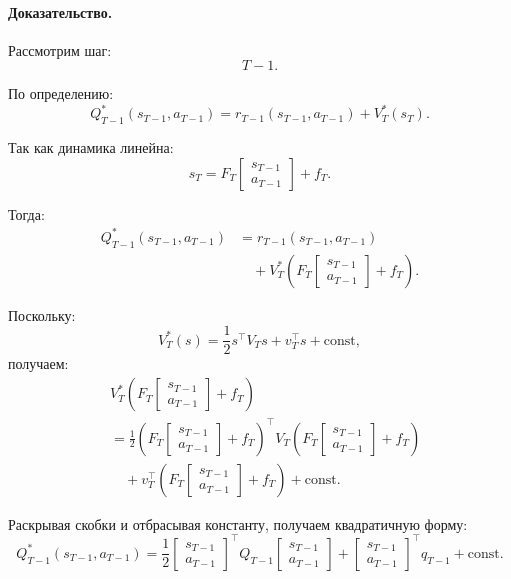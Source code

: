 \documentclass[12pt,a4paper]{article}
\begin{document}
\paragraph{Доказательство.}

Рассмотрим шаг:
\[
T-1.
\]

По определению:
\[
Q_{T-1}^\ast(s_{T-1},a_{T-1})
=
r_{T-1}(s_{T-1},a_{T-1})
+
V_T^\ast(s_T).
\]

Так как динамика линейна:
\[
s_T
=
F_T
\begin{bmatrix}
s_{T-1}\\
a_{T-1}
\end{bmatrix}
+
f_T.
\]

Тогда:
\[
\begin{aligned}
Q_{T-1}^\ast(s_{T-1},a_{T-1})
&=
r_{T-1}(s_{T-1},a_{T-1})
\\
&\quad+
V_T^\ast
\left(
F_T
\begin{bmatrix}
s_{T-1}\\
a_{T-1}
\end{bmatrix}
+
f_T
\right).
\end{aligned}
\]

Поскольку:
\[
V_T^\ast(s)
=
\frac{1}{2}s^\top V_Ts+v_T^\top s+\text{const},
\]
получаем:
\[
\begin{aligned}
&
V_T^\ast
\left(
F_T
\begin{bmatrix}
s_{T-1}\\
a_{T-1}
\end{bmatrix}
+
f_T
\right)
\\
&=
\frac{1}{2}
\left(
F_T
\begin{bmatrix}
s_{T-1}\\
a_{T-1}
\end{bmatrix}
+
f_T
\right)^\top
V_T
\left(
F_T
\begin{bmatrix}
s_{T-1}\\
a_{T-1}
\end{bmatrix}
+
f_T
\right)
\\
&\quad+
v_T^\top
\left(
F_T
\begin{bmatrix}
s_{T-1}\\
a_{T-1}
\end{bmatrix}
+
f_T
\right)
+
\text{const}.
\end{aligned}
\]

Раскрывая скобки и отбрасывая константу, получаем квадратичную форму:
\[
Q_{T-1}^\ast(s_{T-1},a_{T-1})
=
\frac{1}{2}
\begin{bmatrix}
s_{T-1}\\
a_{T-1}
\end{bmatrix}^{\top}
Q_{T-1}
\begin{bmatrix}
s_{T-1}\\
a_{T-1}
\end{bmatrix}
+
\begin{bmatrix}
s_{T-1}\\
a_{T-1}
\end{bmatrix}^{\top}
q_{T-1}
+
\text{const}.
\]
\end{document}
